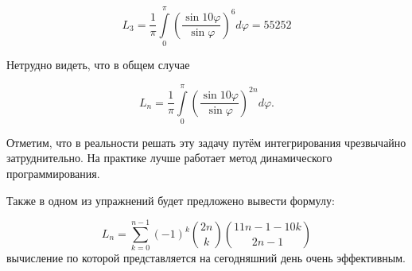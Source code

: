 \documentclass[12pt, letterpaper]{extarticle}
\begin{document}
\[
  L_3=\frac{1}{\pi}\int\limits_{0}^{\pi}{\left(\frac{\sin10\varphi }{\sin\varphi }\right)^6}d\varphi =55252
\]

Нетрудно видеть, что в общем случае

\[
L_n=\frac{1}{\pi}\int\limits_{0}^{\pi}{\left(\frac{\sin10\varphi}{\sin\varphi}\right)^{2n}}d\varphi .
\]

Отметим, что в реальности решать эту задачу путём интегрирования чрезвычайно затруднительно. На практике лучше работает метод динамического программирования.

Также в одном из упражнений будет предложено вывести формулу:

\[
  L_n = \sum_{k=0}^{n-1} (-1)^k \binom{2n}{k}\binom{11n-1-10k}{2n-1}
\]
вычисление по которой представляется на сегодняшний день очень эффективным.
\end{document}

